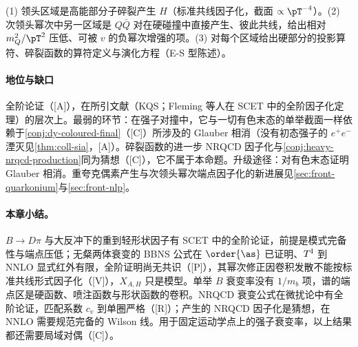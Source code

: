 \begin{proofsketch}
(1) 领头区域是高能部分子碎裂产生 $H$（标准共线因子化，截面 $\propto\pT^{-4}$）。(2) 次领头幂次中另一区域是 $Q\bar Q$ 对在硬碰撞中直接产生、彼此共线，给出相对 $m_Q^2/\pT^2$ 压低、可被 $v$ 的负幂次增强的项\cite{Fleming:2012wy}。(3) 对每个区域给出硬部分的投影算符、碎裂函数的算符定义与演化方程\cite{Kang:2011mg,Kang:2014tta,Fleming:2012wy}（E-S 型陈述）。
\end{proofsketch}

\paragraph{地位与缺口}
全阶论证（[A]），在所引文献（KQS\cite{Kang:2011mg}；Fleming 等人在 SCET 中的全阶因子化定理\cite{Fleming:2012wy}）的层次上。最弱的环节：在强子对撞中，它与一切有色末态的单举截面一样依赖于\cref{conj:dy-coloured-final}（[C]）所涉及的 Glauber 相消（没有初态强子的 $e^+e^-$ 湮灭见\cref{thm:coll-sia}，[A]）。碎裂函数的进一步 NRQCD 因子化与\cref{conj:heavy-nrqcd-production}同为猜想（[C]），它不属于本命题。升级途径：对有色末态证明 Glauber 相消。重夸克偶素产生与次领头幂次端点因子化的新进展见\cref{sec:front-quarkonium}与\cref{sec:front-nlp}。

\paragraph{本章小结。}
$B\to D\pi$ 与大反冲下的重到轻形状因子有 SCET 中的全阶论证，前提是模式完备性与端点压低；无粲两体衰变的 BBNS 公式在 $\order{\as}$ 已证明、$T^{\rm I}$ 到 NNLO 显式红外有限，全阶证明尚无共识（[P]），其幂次修正因卷积发散不能按标准共线形式因子化（[V]），$X_{A,H}$ 只是模型。单举 $B$ 衰变率没有 $1/m_b$ 项，谱的端点区是硬函数、喷注函数与形状函数的卷积。NRQCD 衰变公式在微扰论中有全阶论证，匹配系数 $c_v$ 到单圈严格（[R]）；产生的 NRQCD 因子化是猜想，在 NNLO 需要规范完备的 Wilson 线。用于固定运动学点上的强子衰变率，以上结果都还需要局域对偶（[C]）。
